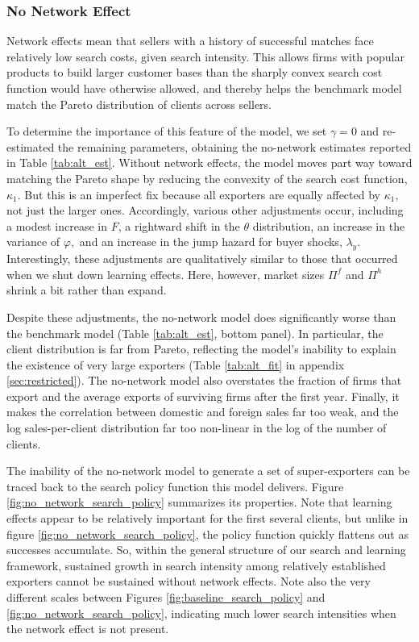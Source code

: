 \documentclass[12pt,titlepage]{article}
\begin{document}
\subsubsection{No Network Effect}

Network effects mean that sellers with a history of successful matches face
relatively low search costs, given search intensity. This allows firms with
popular products to build larger customer bases than the sharply convex
search cost function would have otherwise allowed, and thereby helps the
benchmark model match the Pareto distribution of clients across sellers.

To determine the importance of this feature of the model, we set $\gamma =0$
and re-estimated the remaining parameters, obtaining the no-network
estimates reported in Table \ref{tab:alt_est}. Without network effects, the model moves part way toward matching the
Pareto shape by reducing the convexity of the search cost function, $\kappa
_{1}.$ But this is an imperfect fix because all exporters are equally
affected by $\kappa _{1}$, not just the larger ones. Accordingly, various
other adjustments occur, including a modest increase in $F$, a rightward
shift in the $\theta $ distribution, an increase in the variance of $\varphi
,$ and an increase in the jump hazard for buyer shocks, $\lambda _{y}.$
Interestingly, these adjustments are qualitatively similar to those that
occurred when we shut down learning effects. Here, however, market sizes $%
\Pi ^{f}$ and $\Pi ^{h}$ shrink a bit rather than expand.

Despite these adjustments, the no-network model does significantly worse than
the benchmark model (Table \ref{tab:alt_est}, bottom panel). In particular,
the client distribution is far from Pareto, reflecting the model's inability
to explain the existence of very large exporters (Table \ref{tab:alt_fit} in
appendix \ref{sec:restricted}). The no-network model also overstates the
fraction of firms that export and the average exports of surviving firms
after the first year. Finally, it makes the correlation between domestic and
foreign sales far too weak, and the log sales-per-client distribution far
too non-linear in the log of the number of clients.

The inability of the no-network model to generate a set of super-exporters
can be traced back to the search policy function this model delivers. Figure %
\ref{fig:no_network_search_policy} summarizes its properties. Note that
learning effects appear to be relatively important for the first several
clients, but unlike in figure \ref{fig:no_network_search_policy}, the policy
function quickly flattens out as successes accumulate. So, within the
general structure of our search and learning framework, sustained growth in
search intensity among relatively established exporters cannot be sustained
without network effects. Note also the very different scales between Figures %
\ref{fig:baseline_search_policy} and \ref{fig:no_network_search_policy},
indicating much lower search intensities when the network effect is not
present.
\end{document}
